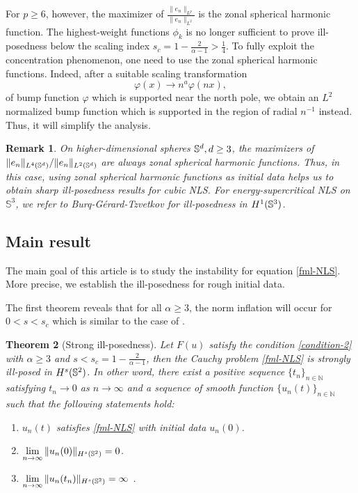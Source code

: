 \documentclass[10pt,a4paper]{amsart}
\numberwithin{equation}{section}
\newtheorem{theorem}{Theorem}[section]
\newtheorem{remark}[theorem]{Remark}
\begin{document}
For $p \geq 6$, however, the maximizer of $\frac{\|e_n\|_{L^p}}{\|e_n\|_{L^2}}$  is the zonal spherical harmonic function. The highest-weight functions $\phi_k$ is no longer sufficient  to prove ill-posedness below the scaling index $s_c = 1 - \frac{2}{\alpha-1} > \frac14$. To fully exploit the concentration phenomenon, one need to use the zonal spherical harmonic functions. Indeed, after a suitable scaling transformation
\begin{equation*}
\varphi(x) \rightarrow n^a\varphi(nx),
\end{equation*} 
of bump function $\varphi$ which is supported near the north pole, we obtain an $L^2$ normalized bump function which is supported in the region of radial $n^{-1}$ instead. Thus, it will simplify the analysis.
	
	
	
\begin{remark}
On higher-dimensional spheres $\Bbb S^d, d\ge3$, the maximizers of $\|e_n\|_{L^4(\Bbb S^d)}/\|e_n\|_{L^2(\Bbb S^d)}$ are always zonal spherical harmonic functions. Thus, in this case, using zonal spherical harmonic functions as initial data helps us to obtain sharp ill-posedness results for cubic NLS. For energy-supercritical NLS on $\mathbb{S}^3$, we refer to Burq-G\'erard-Tzvetkov \cite{Burq3} for ill-posedness in $H^1(\Bbb S^3)$.
\end{remark} 
	
	

	
	
\subsection{Main result}

The main goal of this article is to study the instability for equation \eqref{fml-NLS}. More precise, we establish the ill-posedness for rough initial data. %

The first theorem reveals that for all $\alpha\geq3$, the norm inflation will occur for $0<s<s_c$ which is similar to the case of \cite{CCT-03}. 

\begin{theorem}[Strong ill-posedness]\label{thm-illpose}
Let $F(u) $ satisfy the condition \eqref{condition-2} with $\alpha\ge 3$ and $s<s_c=1-\frac{2}{\alpha-1}$, then the Cauchy problem \eqref{fml-NLS} is strongly ill-posed in $H^s(\Bbb S^2)$. In other word, there exist a positive sequence $\{t_n\}_{n\in\mathbb{N}}$ satisfying $t_n\to 0$ as $n\to\infty$ and a sequence of smooth function $\{u_n(t)\}_{n\in\mathbb{N}}$ such that the following statements hold:
\begin{enumerate}
\item $u_n(t)$ satisfies \eqref{fml-NLS} with initial data $u_n(0)$.
\item $\lim\limits_{n\to\infty}\|u_n(0)\|_{H^s(\Bbb S^2)} = 0$.
\item $\lim\limits_{n\to\infty}\|u_n(t_n)\|_{H^s(\Bbb S^2)} = \infty$ \label{item-unbound}.
\end{enumerate}
\end{theorem}
\end{document}
